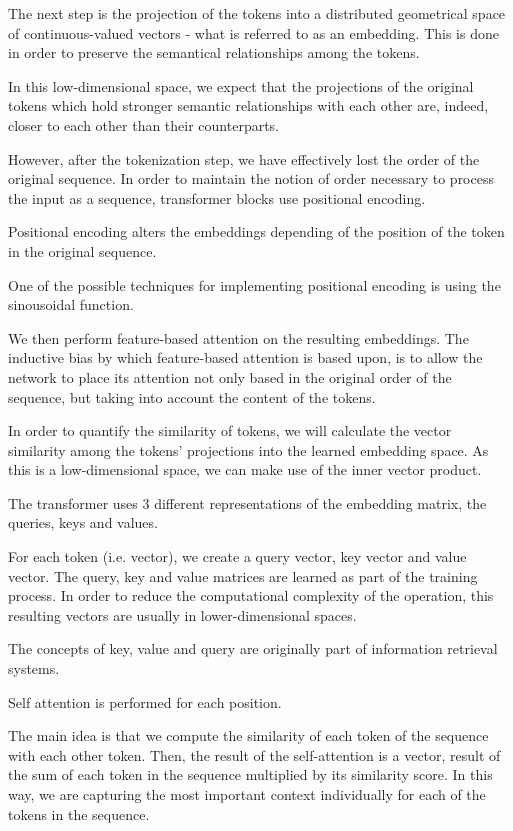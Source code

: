 The next step is the projection of the tokens into a distributed geometrical space of continuous-valued vectors - what is referred to as an embedding. This is done in order to preserve the semantical relationships among the tokens.

In this low-dimensional space, we expect that the projections of the original tokens which hold stronger semantic relationships with each other are, indeed, closer to each other than their counterparts.


However, after the tokenization step, we have effectively lost the order of the original sequence. In order to maintain the notion of order necessary to process the input as a sequence,
transformer blocks use positional encoding.

Positional encoding alters the embeddings depending of the position of the token in the original sequence.

One of the possible techniques for implementing positional encoding is using the sinousoidal function. 

We then perform feature-based attention on the resulting embeddings.
The inductive bias by which feature-based attention is based upon, is to allow the network to place its attention not only based
in the original order of the sequence, but taking into account the content of the tokens.

In order to quantify the similarity of tokens, we will calculate the vector similarity among the tokens' projections
into the learned embedding space. As this is a low-dimensional space, we can make use of the inner vector product.

The transformer uses 3 different representations of the embedding matrix, the queries, keys and values.

For each token (i.e. vector), we create a query vector, key vector and value vector. The query, key and value matrices are
learned as part of the training process.
In order to reduce the computational complexity of the operation, this resulting vectors are usually in lower-dimensional spaces.

The concepts of key, value and query are originally part of information retrieval systems.


Self attention is performed for each position.

The main idea is that we compute the similarity of each token of the sequence with each other token. Then, the result of the 
self-attention is a vector, result of the sum of each token in the sequence multiplied by its similarity score. In this
way, we are capturing the most important context individually for each of the tokens in the sequence.


